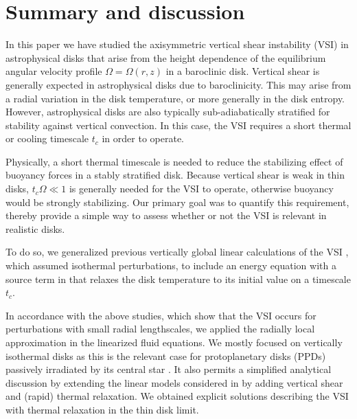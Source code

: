 \section{Summary and discussion}\label{summary}
In this paper we have studied the axisymmetric vertical shear 
instability (VSI) in astrophysical disks that arise from the 
height dependence of the equilibrium angular velocity profile 
$\Omega=\Omega(r,z)$ in a baroclinic disk. Vertical shear is generally
expected in astrophysical disks due to baroclinicity. This may arise 
from a radial variation in the disk temperature, or more generally in
the disk entropy. However, astrophysical disks are also typically
sub-adiabatically stratified for stability against vertical
convection. In this case, the VSI requires a short thermal or cooling
timescale $t_c$ in order to operate.  

Physically, a short thermal timescale is needed to reduce the  
stabilizing effect of buoyancy forces in a stably stratified
disk. Because vertical shear is weak in thin disks, $t_c\Omega\ll 1$
is generally needed for the VSI to operate, otherwise buoyancy would
be strongly stabilizing. Our primary goal was to quantify this
requirement, thereby provide a simple way to assess 
whether or not the VSI is relevant in realistic disks. 

To do so, we generalized previous vertically global linear 
calculations of the VSI , which
assumed isothermal perturbations, to include an energy equation with 
a source term in that relaxes the disk
temperature to its initial value on a timescale
$t_c$. %

In accordance with the above studies, which show that the VSI occurs for 
perturbations with small radial lengthscales, we applied the 
radially local approximation in the linearized fluid equations. 
We mostly focused on vertically isothermal disks as 
this is the relevant case for protoplanetary disks (PPDs) passively
irradiated by its central star \citep{chiang97}. It also permits a
simplified analytical discussion by extending the
linear models considered in \cite{lubow93} by adding vertical shear
and (rapid) thermal relaxation. We obtained explicit solutions 
describing the VSI with thermal relaxation in the thin disk limit.  

